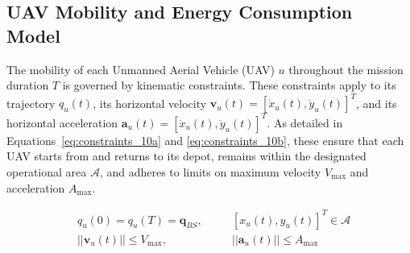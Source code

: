 \documentclass[10pt,conference,letterpaper]{IEEEtran}
\begin{document}




\subsection{UAV Mobility and Energy Consumption Model}
\label{subsec:mobility_energy_model}

The mobility of each Unmanned Aerial Vehicle (UAV) $u$ throughout the mission duration $T$ is governed by kinematic constraints. These constraints apply to its trajectory $q_u(t)$, its horizontal velocity $\mathbf{v}_u(t) = [\dot{x}_u(t), \dot{y}_u(t)]^T$, and its horizontal acceleration $\mathbf{a}_u(t) = [\ddot{x}_u(t), \ddot{y}_u(t)]^T$. As detailed in Equations~\eqref{eq:constraints_10a} and \eqref{eq:constraints_10b}, these ensure that each UAV starts from and returns to its depot, remains within the designated operational area $\mathcal{A}$, and adheres to limits on maximum velocity $V_{\text{max}}$ and acceleration $A_{\text{max}}$.


\begin{align}
    & q_u(0)=q_u(T)=\mathbf{q}_{BS}, \quad &&[x_u(t),y_u(t)]^T \in \mathcal{A}  \label{eq:constraints_10a} \\
    & ||\mathbf{v}_u(t)|| \leq V_{\text{max}}, \quad &&||\mathbf{a}_u(t)|| \leq A_{\text{max}} \label{eq:constraints_10b}
\end{align}
\end{document}
